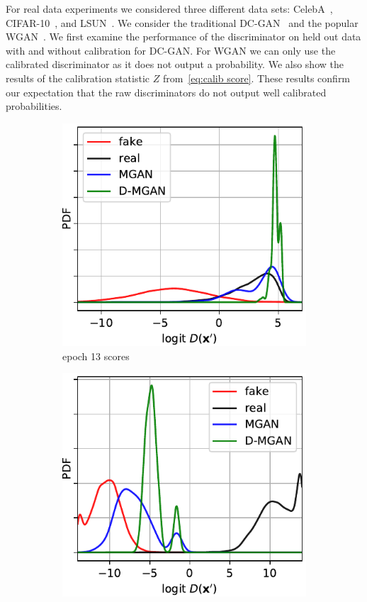 \documentclass{article}
\begin{document}
For real data experiments we considered three different data sets: CelebA~\citep{Liu2015}, CIFAR-10~\citep{Torralba2008}, and LSUN~\citep{Yu2015}.
We consider the traditional DC-GAN~\citep{Radford2015} and the popular WGAN~\citep{Arjovsky2017}\@.
We first examine the performance of the discriminator on held out data with and without calibration for DC-GAN\@.
For WGAN we can only use the calibrated discriminator as it does not output a probability.
We also show the results of the calibration statistic $Z$ from~\eqref{eq:calib score}.
These results confirm our expectation that the raw discriminators do not output well calibrated probabilities.

\begin{figure}
    \centering
    \begin{subfigure}[b]{0.49\textwidth}
       \centering
       \includegraphics[scale=0.9]{figures/score_dist_overlap.pdf}
       \caption{epoch 13 scores}
       \label{fig:score_dist_overlap}
    \end{subfigure}
    \begin{subfigure}[b]{0.49\textwidth}
       \centering
       \includegraphics[scale=0.9]{figures/score_dist_no_overlap.pdf}

\end{subfigure}
\end{figure}
\end{document}
